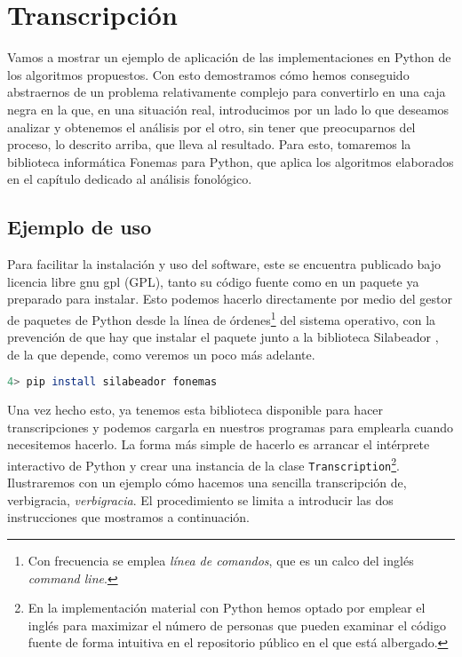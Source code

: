 \section*{Transcripción}
Vamos a mostrar un ejemplo de aplicación de las implementaciones en Python de los algoritmos propuestos. Con esto demostramos cómo hemos conseguido abstraernos de un problema relativamente complejo para convertirlo en una caja negra en la que, en una situación real, introducimos por un lado lo que deseamos analizar y obtenemos el análisis por el otro, sin tener que preocuparnos del proceso, lo descrito arriba, que lleva al resultado. Para esto, tomaremos la biblioteca informática Fonemas \parencite{sanz2021sa} para Python, que aplica los algoritmos elaborados en el capítulo dedicado al análisis fonológico.

\subsection*{Ejemplo de uso}
Para facilitar la instalación y uso del software, este se encuentra  publicado bajo licencia libre \ac{gnu} \acl{gpl} (GPL), tanto su código fuente como en un paquete ya preparado para instalar. Esto podemos hacerlo directamente por medio del gestor de paquetes de Python desde la línea de órdenes\footnote{Con frecuencia se emplea \textit{línea de comandos}, que es un calco del inglés \textit{command line}.} del sistema operativo, con la prevención de que hay que instalar el paquete junto a la biblioteca Silabeador \parencite{sanz2021sb}, de la que depende, como veremos un poco más adelante.

\begin{lstlisting}[numbers=none, frame=none, keywordstyle=\ttfamily, language=bash]
	4> pip install silabeador fonemas
\end{lstlisting}

Una vez hecho esto, ya tenemos esta biblioteca disponible para hacer transcripciones y podemos cargarla en nuestros programas para emplearla cuando necesitemos hacerlo. La forma más simple de hacerlo es arrancar el intérprete interactivo de Python y crear una instancia de la clase \texttt{Transcription}\footnote{En la implementación material con Python hemos optado por emplear el inglés para maximizar el número de personas que pueden examinar el código fuente de forma intuitiva en el repositorio público en el que está albergado.}. Ilustraremos con un ejemplo cómo hacemos una sencilla transcripción de, verbigracia, \textit{verbigracia}. El procedimiento se limita a introducir las dos instrucciones que mostramos a continuación.

